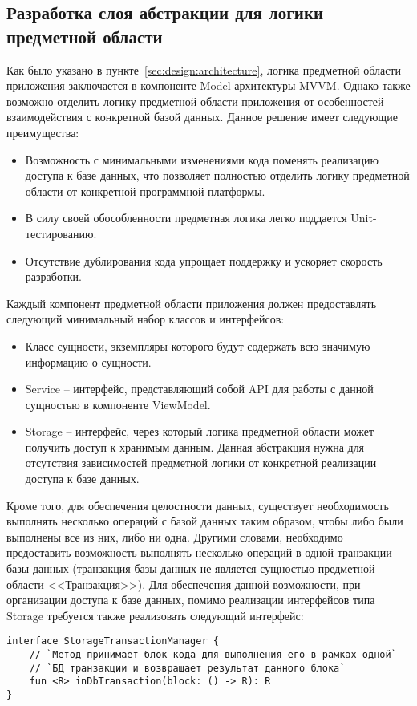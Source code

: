 \subsection{Разработка слоя абстракции для логики предметной области}
\label{sec:design:business}

Как было указано в пункте~\ref{sec:design:architecture}, логика предметной области приложения заключается в компоненте Model архитектуры MVVM\@.
Однако также возможно отделить логику предметной области приложения от особенностей взаимодействия с конкретной базой данных.
Данное решение имеет следующие преимущества:
\begin{itemize}
    \item Возможность с минимальными изменениями кода поменять реализацию доступа к базе данных, что позволяет полностью отделить логику предметной области от конкретной программной платформы.
    \item В силу своей обособленности предметная логика легко поддается Unit-тестированию.
    \item Отсутствие дублирования кода упрощает поддержку и ускоряет скорость разработки.
\end{itemize}

Каждый компонент предметной области приложения должен предоставлять следующий минимальный набор классов и интерфейсов:
\begin{itemize}
    \item Класс сущности, экземпляры которого будут содержать всю значимую информацию о сущности.
    \item Service -- интерфейс, представляющий собой API для работы с данной сущностью в компоненте ViewModel.
    \item Storage -- интерфейс, через который логика предметной области может получить доступ к хранимым данным.
    Данная абстракция нужна для отсутствия зависимостей предметной логики от конкретной реализации доступа к базе данных.
\end{itemize}

Кроме того, для обеспечения целостности данных, существует необходимость выполнять несколько операций с базой данных таким образом, чтобы либо были выполнены все из них, либо ни одна.
Другими словами, необходимо предоставить возможность выполнять несколько операций в одной транзакции базы данных (транзакция базы данных не является сущностью предметной области <<Транзакция>>).
Для обеспечения данной возможности, при организации доступа к базе данных, помимо реализации интерфейсов типа Storage требуется также реализовать следующий интерфейс:
\begin{lstlisting}[style=standard]
interface StorageTransactionManager {
    // `Метод принимает блок кода для выполнения его в рамках одной`
    // `БД транзакции и возвращает результат данного блока`
    fun <R> inDbTransaction(block: () -> R): R
}
\end{lstlisting}

